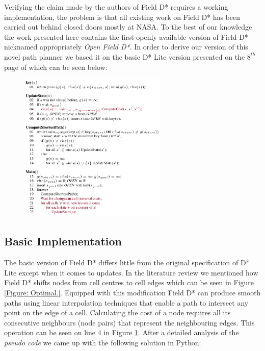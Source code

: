 \noindent
Verifying the claim made by the authors of Field D* requires a working implementation, the problem is that all existing work on Field D* has been carried out behind closed doors mostly at NASA. To the best of our knowledge the work presented here contains the first openly available version of Field D* nicknamed appropriately \textit{Open Field D*}. In order to derive our version of this novel path planner we based it on the basic D* Lite version presented on the $8^{th}$ page of \cite{FIELD} which can be seen below:

\begin{figure}[htbp]

\center \includegraphics[width=200pt]{illustrations/field_d_basic}\\
\caption{} 
\label{field_d_basic}

\end{figure}

\subsection{Basic Implementation}

\noindent
The basic version of Field D* differs little from the original specification of D* Lite except when it comes to updates. In the literature review we mentioned how Field D* shifts nodes from cell centres to cell edges which can be seen in Figure \ref{Figure: Optimal.}. Equipped with this modification Field D* can produce smooth paths using linear interpolation techniques that enable a path to intersect any point on the edge of a cell. Calculating the cost of a node requires all its consecutive neighbours (node pairs) that represent the neighbouring edges. This operation can be seen on line 4 in Figure \ref{field_d_basic}. After a detailed analysis of the \textit{pseudo code} we came up with the following solution in Python: \\

